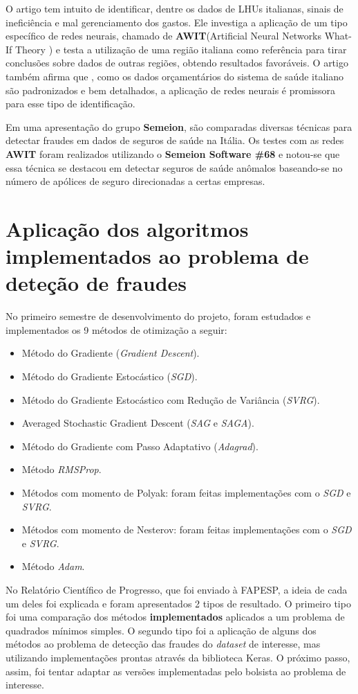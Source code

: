 \documentclass[11pt]{article}
\begin{document}
\noindent
O artigo \cite{fraudeItalia2} tem intuito de identificar, dentre os dados de LHUs italianas, sinais de ineficiência e mal gerenciamento dos gastos. Ele investiga a aplicação de um tipo específico de redes neurais, chamado de \textbf{AWIT}\cite{AWIT}(Artificial Neural Networks What-If Theory ) e testa a utilização de uma região italiana como referência para tirar conclusões sobre dados de outras regiões, obtendo  resultados favoráveis. O artigo também afirma que , como os dados orçamentários do sistema de saúde italiano são padronizados e bem detalhados, a aplicação de redes neurais é promissora para esse tipo de identificação.

Em uma apresentação do grupo \textbf{Semeion}\cite{SEMEION}, são comparadas diversas técnicas para detectar fraudes em dados de seguros de saúde na Itália. Os testes com as redes \textbf{AWIT} foram realizados utilizando o \textbf{Semeion Software \#68} e notou-se que essa técnica se destacou em detectar seguros de saúde anômalos baseando-se no número de apólices de seguro direcionadas a certas empresas.


\section{Aplicação dos algoritmos implementados ao problema de deteção de fraudes}
No primeiro semestre de desenvolvimento do projeto, foram estudados e implementados os 9 métodos de otimização a seguir:
\begin{itemize}
\item Método do Gradiente (\textit{Gradient Descent}).
\item Método do Gradiente Estocástico (\textit{SGD}).
\item Método do Gradiente Estocástico com Redução de Variância (\textit{SVRG}).
\item Averaged Stochastic Gradient Descent (\textit{SAG} e \textit{SAGA}).
\item Método do Gradiente com Passo Adaptativo (\textit{Adagrad}).
\item Método \textit{RMSProp}.
\item Métodos com momento de Polyak: foram feitas implementações com o \textit{SGD} e \textit{SVRG}.
\item Métodos com momento de Nesterov: foram feitas implementações com o \textit{SGD} e \textit{SVRG}.
\item Método \textit{Adam}.
\end{itemize}
No Relatório Científico de Progresso, que foi enviado à FAPESP, a ideia de cada um deles foi explicada e foram apresentados 2 tipos de resultado. O primeiro tipo foi uma comparação dos métodos \textbf{implementados} aplicados a um problema de quadrados mínimos simples. O segundo tipo foi a aplicação de alguns dos métodos ao problema de detecção das fraudes do \textit{dataset} de interesse, mas utilizando implementações prontas através da biblioteca Keras\cite{KERAS}. O próximo passo, assim, foi tentar adaptar as versões implementadas pelo bolsista ao problema de interesse.
\end{document}
